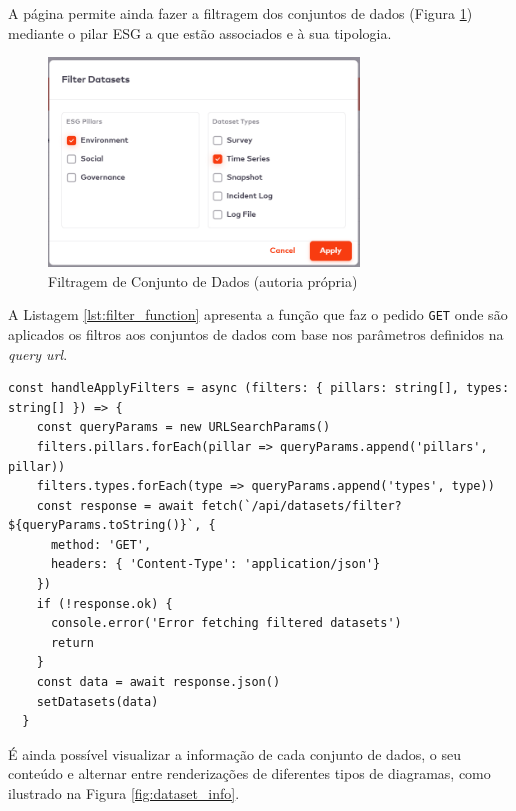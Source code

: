 A página permite ainda fazer a filtragem dos conjuntos de dados (Figura \ref{fig:dataset_filter}) mediante o pilar ESG a que estão associados e à sua tipologia.

\begin{figure}[H]
    \centering
    \includegraphics[width=3.25in,keepaspectratio]{frontmatter/assets/platform_prints/dataset/dataset_filter.png}
    \caption{Filtragem de Conjunto de Dados (autoria própria)}
    \label{fig:dataset_filter}
\end{figure}

A Listagem \ref{lst:filter_function} apresenta a função que faz o pedido \texttt{GET} onde são aplicados os filtros aos conjuntos de dados com base nos parâmetros definidos na \textit{query url}.

\begin{lstlisting}[style=customts, caption={Função de Filtragem de Conjunto de Dados}, label={lst:filter_function}]
const handleApplyFilters = async (filters: { pillars: string[], types: string[] }) => {
    const queryParams = new URLSearchParams()
    filters.pillars.forEach(pillar => queryParams.append('pillars', pillar))
    filters.types.forEach(type => queryParams.append('types', type))
    const response = await fetch(`/api/datasets/filter?${queryParams.toString()}`, {
      method: 'GET',
      headers: { 'Content-Type': 'application/json'}
    })
    if (!response.ok) {
      console.error('Error fetching filtered datasets')
      return
    }
    const data = await response.json()
    setDatasets(data)
  }
\end{lstlisting}


É ainda possível visualizar a informação de cada conjunto de dados, o seu conteúdo e alternar entre renderizações de diferentes tipos de diagramas, como ilustrado na Figura \ref{fig:dataset_info}.

